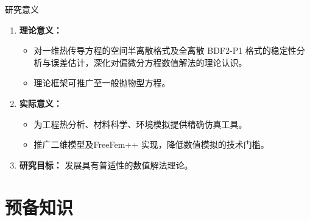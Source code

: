\documentclass[aspectratio=169, xetex, 12pt]{beamer}  %
\begin{document}
\begin{frame}{研究意义}
	\begin{enumerate}
		\setlength{\itemsep}{0.7em}   %
		\item \textbf{理论意义：}
		\begin{itemize}
			\setlength{\itemsep}{0.4em}   %
			\item 对一维热传导方程的空间半离散格式及全离散 BDF2-P1 格式的稳定性分析与误差估计，深化对偏微分方程数值解法的理论认识。
			\item 理论框架可推广至一般抛物型方程。
		\end{itemize}
		\vspace{0.3em}
		\item \textbf{实际意义：}
		\begin{itemize}
			\setlength{\itemsep}{0.4em}
			\item 为工程热分析、材料科学、环境模拟提供精确仿真工具。
			\item 推广二维模型及FreeFem++ 实现，降低数值模拟的技术门槛。
		\end{itemize}
			\vspace{0.3em}
		\item \textbf{研究目标：}
		发展具有普适性的数值解法理论。
\end{enumerate}
\end{frame}
	
	\section{预备知识}
	
\end{document}
